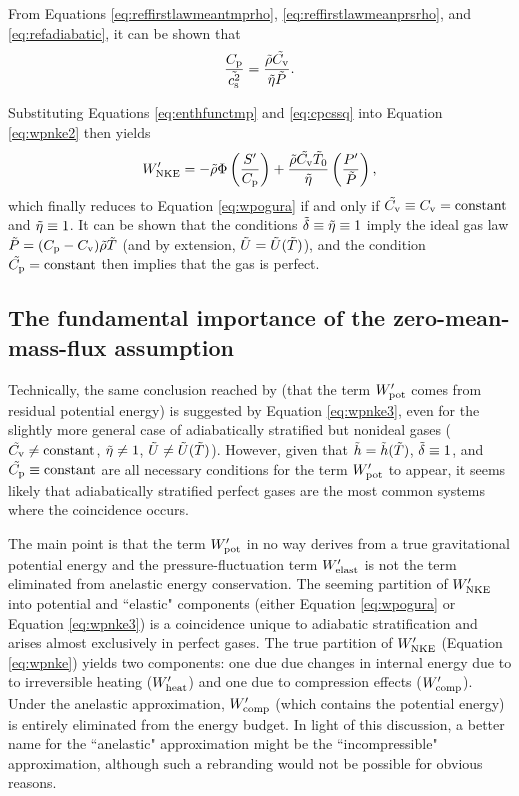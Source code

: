 \documentclass[12pt]{article}
\newcommand{\wpnke}{W^\prime_{\rm NKE}}
\newcommand{\wpheat}{W^\prime_{\rm heat}}
\newcommand{\wpcomp}{W^\prime_{\rm comp}}
\newcommand{\wppot}{W^\prime_{\rm pot}}
\newcommand{\wpelast}{W^\prime_{\rm elast}}
\begin{document}
From Equations \eqref{eq:reffirstlawmeantmprho}, \eqref{eq:reffirstlawmeanprsrho}, and \eqref{eq:refadiabatic}, it can be shown that
\begin{align}\label{eq:cpcssq}
	\frac{C_{\rm{p}}}{\tilde{c_{\rm s}^2}} = \frac{\tilde{\rho}\tilde{C_{\rm{v}}}}{\tilde{\eta}\tilde{P}}.
\end{align}

Substituting Equations \eqref{eq:enthfunctmp} and \eqref{eq:cpcssq} into Equation \eqref{eq:wpnke2} then yields
\begin{align}\label{eq:wpnke3}
	\wpnke =-\rhotilde\Phi\left(\frac{\entrprime}{\cpcap}\right) + \frac{\rhotilde\cvtilde\tmptilde_0}{\etatilde}\left(\frac{\prsprime}{\prstilde}\right),
\end{align}
which finally reduces to Equation \eqref{eq:wpogura} if and only if $\tilde{C_{\rm{v}}}\equiv C_{\rm{v}}=\text{constant}$ and $\tilde{\eta}\equiv1$. It can be shown that the conditions $\tilde{\delta}\equiv\tilde{\eta}\equiv1$ imply the ideal gas law $\tilde{P}=(C_{\rm{p}}-C_{\rm{v}})\tilde{\rho}\tilde{T}$ (and by extension, $\tilde{U}=\tilde{U}(\tilde{T})$), and the condition $\tilde{C_{\rm{p}}}=\text{constant}$ then implies that the gas is perfect.

\subsection{The fundamental importance of the zero-mean-mass-flux assumption}
Technically, the same conclusion reached by \citet{Ogura1962} (that the term $\wppot$ comes from residual potential energy) is suggested by Equation \eqref{eq:wpnke3}, even for the slightly more general case of adiabatically stratified but nonideal gases ($\tilde{C_{\rm{v}}}\neq\text{constant}$, $\tilde{\eta}\neq1$, $\tilde{U}\neq\tilde{U}(\tilde{T})$). However, given that $\tilde{h}=\tilde{h}(\tilde{T})$, $\tilde{\delta}\equiv1$, and $\tilde{C_{\rm{p}}}\equiv\text{constant}$ are all necessary conditions for the term $\wppot$ to appear, it seems likely that adiabatically stratified perfect gases are the most common systems where the coincidence occurs. 

The main point is that the term $\wppot$ in no way derives from a true gravitational potential energy and the pressure-fluctuation term $\wpelast$ is not the term eliminated from anelastic energy conservation. The seeming partition of $\wpnke$ into potential and ``elastic" components (either Equation \eqref{eq:wpogura} or Equation \eqref{eq:wpnke3}) is a coincidence unique to adiabatic stratification and arises almost exclusively in perfect gases. The true partition of $\wpnke$ (Equation \eqref{eq:wpnke}) yields two components: one due due changes in internal energy due to to irreversible heating ($\wpheat$) and one due to compression effects ($\wpcomp$). Under the anelastic approximation, $\wpcomp$ (which contains the potential energy) is entirely eliminated from the energy budget. In light of this discussion, a better name for the ``anelastic" approximation might be the ``incompressible" approximation, although such a rebranding would not be possible for obvious reasons. 
\end{document}
